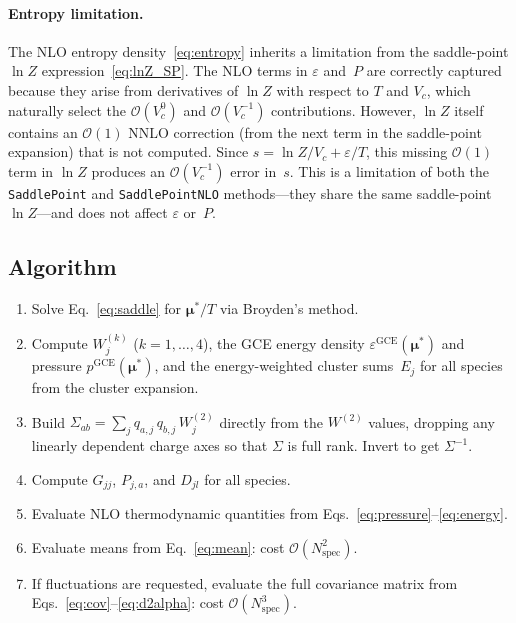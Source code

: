\documentclass[11pt]{article}
\newcommand{\bmu}{\bm{\mu}}
\newcommand{\GCE}{\mathrm{GCE}}
\begin{document}
\paragraph{Entropy limitation.}
The NLO entropy density~\eqref{eq:entropy} inherits a limitation from the saddle-point $\ln Z$ expression~\eqref{eq:lnZ_SP}.
The NLO terms in $\varepsilon$ and~$P$ are correctly captured because they arise from derivatives of $\ln Z$ with respect to $T$ and $V_c$, which naturally select the $\mathcal{O}(V_c^0)$ and $\mathcal{O}(V_c^{-1})$ contributions.
However, $\ln Z$ itself contains an $\mathcal{O}(1)$ NNLO correction (from the next term in the saddle-point expansion) that is not computed.
Since $s = \ln Z/V_c + \varepsilon/T$, this missing $\mathcal{O}(1)$ term in $\ln Z$ produces an $\mathcal{O}(V_c^{-1})$ error in~$s$.
This is a limitation of both the \texttt{SaddlePoint} and \texttt{SaddlePointNLO} methods---they share the same saddle-point $\ln Z$---and does not affect $\varepsilon$ or~$P$.

\subsection{Algorithm}

\begin{enumerate}
  \item Solve Eq.~\eqref{eq:saddle} for $\bmu^*/T$ via Broyden's method.
  \item Compute $W_j^{(k)}$ ($k = 1,\ldots,4$), the GCE energy density $\varepsilon^{\GCE}(\bmu^*)$ and pressure $p^{\GCE}(\bmu^*)$, and the energy-weighted cluster sums~$E_j$ for all species from the cluster expansion.
  \item Build $\Sigma_{ab} = \sum_j q_{a,j}\,q_{b,j}\,W_j^{(2)}$ directly from the $W^{(2)}$ values, dropping any linearly dependent charge axes so that $\Sigma$ is full rank.  Invert to get $\Sigma^{-1}$.
  \item Compute $G_{jj}$, $P_{j,a}$, and $D_{jl}$ for all species.
  \item Evaluate NLO thermodynamic quantities from Eqs.~\eqref{eq:pressure}--\eqref{eq:energy}.
  \item Evaluate means from Eq.~\eqref{eq:mean}: cost $\mathcal{O}(N_\mathrm{spec}^2)$.
  \item If fluctuations are requested, evaluate the full covariance matrix from Eqs.~\eqref{eq:cov}--\eqref{eq:d2alpha}: cost $\mathcal{O}(N_\mathrm{spec}^3)$.
\end{enumerate}
\end{document}
